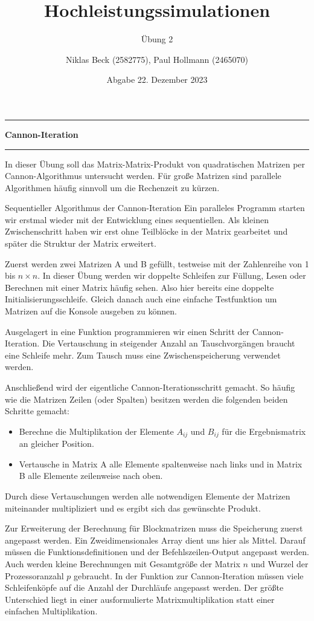 \documentclass[
ngerman,
subtask=ruled %
]{tudaexercise}
\begin{document}
	
	\title[Übung Hochleistungssimulationen]{Hochleistungssimulationen}
	\subtitle{\"Ubung 2}
	\author{Niklas Beck (2582775), Paul Hollmann (2465070)}
	\date{Abgabe 22. Dezember 2023}
	\maketitle
	
	\hrule
	{\Large \textbf{Cannon-Iteration}}
	\hrule
	
	In dieser Übung soll das Matrix-Matrix-Produkt von quadratischen Matrizen per Cannon-Algorithmus untersucht werden.
	Für große Matrizen sind parallele Algorithmen häufig sinnvoll um die Rechenzeit zu kürzen.
	
	\begin{task}{Sequentieller Algorithmus der Cannon-Iteration}\label{task:1}
		Ein paralleles Programm starten wir erstmal wieder mit der Entwicklung eines sequentiellen.
		Als kleinen Zwischenschritt haben wir erst ohne Teilblöcke in der Matrix gearbeitet und später die Struktur der Matrix erweitert.
		
		Zuerst werden zwei Matrizen A und B gefüllt, testweise mit der Zahlenreihe von 1 bis $n \times n$.
		In dieser Übung werden wir doppelte Schleifen zur Füllung, Lesen oder Berechnen mit einer Matrix häufig sehen.
		Also hier bereits eine doppelte Initialisierungsschleife. Gleich danach auch eine einfache Testfunktion um Matrizen auf die Konsole ausgeben zu können.
		
		Ausgelagert in eine Funktion programmieren wir einen Schritt der Cannon-Iteration.
		Die Vertauschung in steigender Anzahl an Tauschvorgängen braucht eine Schleife mehr. Zum Tausch muss eine Zwischenspeicherung verwendet werden.
		
		Anschließend wird der eigentliche Cannon-Iterationsschritt gemacht. So häufig wie die Matrizen Zeilen (oder Spalten) besitzen werden die folgenden beiden Schritte gemacht:
		\begin{itemize}
			\item Berechne die Multiplikation der Elemente $A_{ij}$ und $B_{ij}$ für die Ergebnismatrix an gleicher Position.
			\item Vertausche in Matrix A alle Elemente spaltenweise nach links und in Matrix B alle Elemente zeilenweise nach oben.
		\end{itemize}
		Durch diese Vertauschungen werden alle notwendigen Elemente der Matrizen miteinander multipliziert und es ergibt sich das gewünschte Produkt.
		
		Zur Erweiterung der Berechnung für Blockmatrizen muss die Speicherung zuerst angepasst werden. Ein Zweidimensionales Array dient uns hier als Mittel. Darauf müssen die Funktionsdefinitionen und der Befehlszeilen-Output angepasst werden.
		Auch werden kleine Berechnungen mit Gesamtgröße der Matrix $n$ und Wurzel der Prozessoranzahl $p$ gebraucht.
		In der Funktion zur Cannon-Iteration müssen viele Schleifenköpfe auf die Anzahl der Durchläufe angepasst werden.
		Der größte Unterschied liegt in einer ausformulierte Matrixmultiplikation statt einer einfachen Multiplikation.
	\end{task}
	
\end{document}
